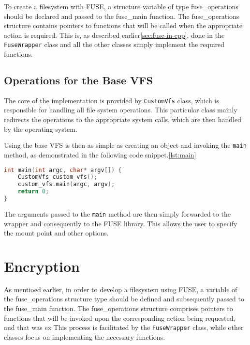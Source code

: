 To create a filesystem with FUSE, a structure variable of type fuse\_operations should be declared and passed to the fuse\_main function.
The fuse\_operations structure contains pointers to functions that will be called when the appropriate action is required.
This is, as described earlier\ref{sec:fuse-in-cpp}, done in the \texttt{FuseWrapper} class and all the other classes simply implement the required functions.

\subsection{Operations for the Base VFS}\label{subsec:base-ops}

The core of the implementation is provided by \texttt{CustomVfs} class, which is responsible for handling all file system operations.
This particular class mainly redirects the operations to the appropriate system calls, which are then handled by the operating system.


Using the base VFS is then as simple as creating an object and invoking the \texttt{main} method, as demonstrated in the following code snippet.\ref{lst:main}

\begin{lstlisting}[language=c++, basicstyle=\ttfamily\small, caption={Main method of the \texttt{CustomVfs} class.}, label={lst:main}]
int main(int argc, char* argv[]) {
    CustomVfs custom_vfs();
    custom_vfs.main(argc, argv);
    return 0;
}
\end{lstlisting}

The arguments passed to the \texttt{main} method are then simply forwarded to the wrapper and consequently to the FUSE library.
This allows the user to specify the mount point and other options.


\section{Encryption}\label{sec:encryption}

As mentioed earlier, in order to develop a filesystem using FUSE, a variable of the fuse\_operations structure type should be defined and subsequently passed to the fuse\_main function.
The fuse\_operations structure comprises pointers to functions that will be invoked upon the corresponding action being requested, and that was ex
This process is facilitated by the \texttt{FuseWrapper} class, while other classes focus on implementing the necessary functions.

